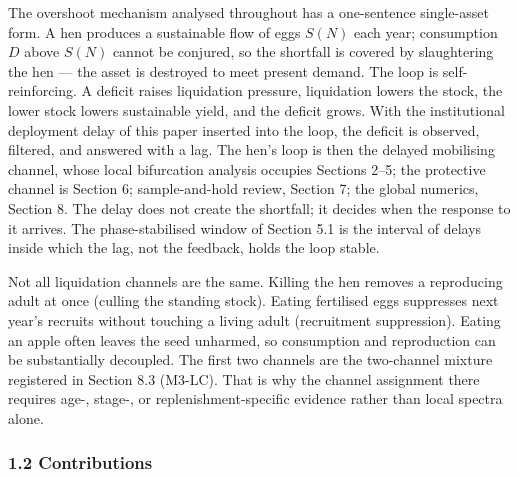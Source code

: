\documentclass[11pt]{article}
\begin{document}
The overshoot mechanism analysed throughout has a one-sentence
single-asset form. A hen produces a sustainable flow of eggs \(S(N)\)
each year; consumption \(D\) above \(S(N)\) cannot be conjured, so the
shortfall is covered by slaughtering the hen --- the asset is destroyed
to meet present demand. The loop is self-reinforcing. A deficit raises
liquidation pressure, liquidation lowers the stock, the lower stock
lowers sustainable yield, and the deficit grows. With the institutional
deployment delay of this paper inserted into the loop, the deficit is
observed, filtered, and answered with a lag. The hen's loop is then the
delayed mobilising channel, whose local bifurcation analysis occupies
Sections 2--5; the protective channel is Section 6; sample-and-hold
review, Section 7; the global numerics, Section 8. The delay does not
create the shortfall; it decides when the response to it arrives. The
phase-stabilised window of Section 5.1 is the interval of delays inside
which the lag, not the feedback, holds the loop stable.

Not all liquidation channels are the same. Killing the hen removes a
reproducing adult at once (culling the standing stock). Eating
fertilised eggs suppresses next year's recruits without touching a
living adult (recruitment suppression). Eating an apple often leaves the
seed unharmed, so consumption and reproduction can be substantially
decoupled. The first two channels are the two-channel mixture registered
in Section 8.3 (M3-LC). That is why the channel assignment there
requires age-, stage-, or replenishment-specific evidence rather than
local spectra alone.

\subsubsection{1.2 Contributions}\label{contributions}
\end{document}
